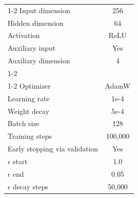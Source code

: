 \documentclass{article}
\begin{document}
\begin{table}[H]
\begin{tabular}{l|c}
    \cmidrule(r){1-2} 
    Input dimension & 256 \\
    Hidden dimension & 64 \\
    Activation & ReLU \\
    Auxiliary input & Yes \\
    Auxiliary dimension & 4 \\
    \cmidrule(r){1-2} 
    \multicolumn{2}{c}{Training}\\
    \cmidrule(r){1-2} 
    Optimizer & AdamW \\
    Learning rate & 1e-4 \\
    Weight decay & 5e-4 \\
    Batch size & 128 \\
    Training steps & 100,000 \\
    Early stopping via validation & Yes \\
    $\epsilon$ start & 1.0 \\
    $\epsilon$ end & 0.05 \\
    $\epsilon$ decay steps & 50,000 \\
    \bottomrule 
    \end{tabular}
\end{table}
\end{document}
